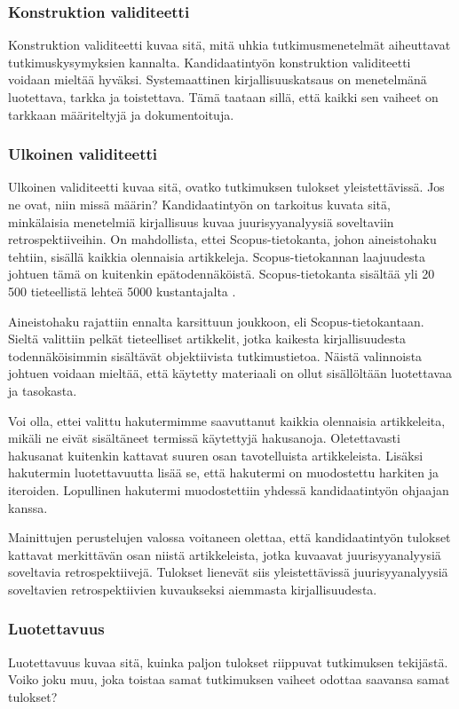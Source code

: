 \subsubsection{Konstruktion validiteetti}
Konstruktion validiteetti kuvaa sitä, mitä uhkia tutkimusmenetelmät aiheuttavat tutkimuskysymyksien kannalta. Kandidaatintyön konstruktion validiteetti voidaan mieltää hyväksi. Systemaattinen kirjallisuuskatsaus on menetelmänä luotettava, tarkka ja toistettava. Tämä taataan sillä, että kaikki sen vaiheet on tarkkaan määriteltyjä ja dokumentoituja.

\subsubsection{Ulkoinen validiteetti}
Ulkoinen validiteetti kuvaa sitä, ovatko tutkimuksen tulokset yleistettävissä. Jos ne ovat, niin missä määrin?
Kandidaatintyön on tarkoitus kuvata sitä, minkälaisia menetelmiä kirjallisuus kuvaa juurisyyanalyysiä soveltaviin retrospektiiveihin. On mahdollista, ettei Scopus-tietokanta, johon aineistohaku tehtiin, sisällä kaikkia olennaisia artikkeleja. Scopus-tietokannan laajuudesta johtuen tämä on kuitenkin epätodennäköistä. Scopus-tietokanta sisältää yli 20 500 tieteellistä lehteä 5000 kustantajalta \citep{Scopus2013}.

Aineistohaku rajattiin ennalta karsittuun joukkoon, eli Scopus-tietokantaan. Sieltä valittiin pelkät tieteelliset artikkelit, jotka kaikesta kirjallisuudesta todennäköisimmin sisältävät objektiivista tutkimustietoa. Näistä valinnoista johtuen voidaan mieltää, että käytetty materiaali on ollut sisällöltään luotettavaa ja tasokasta.

Voi olla, ettei valittu hakutermimme saavuttanut kaikkia olennaisia artikkeleita, mikäli ne eivät sisältäneet termissä käytettyjä hakusanoja. Oletettavasti hakusanat kuitenkin kattavat suuren osan tavotelluista artikkeleista. Lisäksi hakutermin luotettavuutta lisää se, että hakutermi on muodostettu harkiten ja iteroiden. Lopullinen hakutermi muodostettiin yhdessä kandidaatintyön ohjaajan kanssa. 

Mainittujen perustelujen valossa voitaneen olettaa, että kandidaatintyön tulokset kattavat merkittävän osan niistä artikkeleista, jotka kuvaavat juurisyyanalyysiä soveltavia retrospektiivejä. Tulokset lienevät siis yleistettävissä juurisyyanalyysiä soveltavien retrospektiivien kuvaukseksi aiemmasta kirjallisuudesta.

\subsubsection{Luotettavuus}
Luotettavuus kuvaa sitä, kuinka paljon tulokset riippuvat tutkimuksen tekijästä. Voiko joku muu, joka toistaa samat tutkimuksen vaiheet odottaa saavansa samat tulokset?

